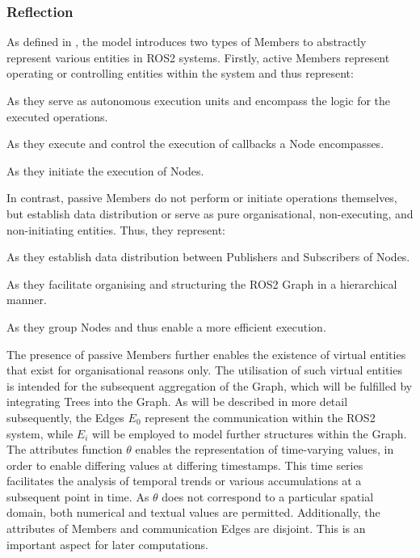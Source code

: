     \subsubsection{Reflection}
    As defined in , the model introduces two types of Members to abstractly represent various entities in ROS2 systems. Firstly, active Members represent operating or controlling entities within the system and thus represent:
    \begin{description}[labelwidth=3cm, leftmargin=3.7cm]
        \item [\hspace{.5cm} Nodes] As they serve as autonomous execution units and encompass the logic for the executed operations.
        \item [\hspace{.5cm} Executors] As they execute and control the execution of callbacks a Node encompasses.
        \item [\hspace{.5cm} Launch Files] As they initiate the execution of Nodes.
    \end{description}

    In contrast, passive Members do not perform or initiate operations themselves, but establish data distribution or serve as pure organisational, non-executing, and non-initiating entities. Thus, they represent:
    \begin{description}[labelwidth=3cm, leftmargin=3.7cm]
        \item [\hspace{.5cm} Topics] As they establish data distribution between Publishers and Subscribers of Nodes.
        \item [\hspace{.5cm} Namespaces] As they facilitate organising and structuring the ROS2 Graph in a hierarchical manner.
        \item [\hspace{.5cm} Containers] As they group Nodes and thus enable a more efficient execution.
    \end{description}
    The presence of passive Members further enables the existence of virtual entities that exist for organisational reasons only. The utilisation of such virtual entities is intended for the subsequent aggregation of the Graph, which will be fulfilled by integrating Trees into the Graph.\newline
    As will be described in more detail subsequently, the Edges $E_0$ represent the communication within the ROS2 system, while $E_i$ will be employed to model further structures within the Graph. \newline    
    The attributes function $\theta$ enables the representation of time-varying values, in order to enable differing values at differing timestamps. This time series facilitates the analysis of temporal trends or various accumulations at a subsequent point in time. As $\theta$ does not correspond to a particular spatial domain, both numerical and textual values are permitted. Additionally, the attributes of Members and communication Edges are disjoint. This is an important aspect for later computations.

